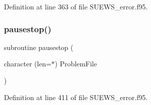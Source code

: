 Definition at line 363 of file S\+U\+E\+W\+S\+\_\+error.\+f95.

\mbox{\label{_s_u_e_w_s__error_8f95_a4b8296fcae72f02e79743ba9e6b75619}} 
\subsubsection{\texorpdfstring{pausestop()}{pausestop()}}
{\footnotesize\ttfamily subroutine pausestop (\begin{DoxyParamCaption}\item[{character (len=$\ast$)}]{Problem\+File }\end{DoxyParamCaption})}



Definition at line 411 of file S\+U\+E\+W\+S\+\_\+error.\+f95.

